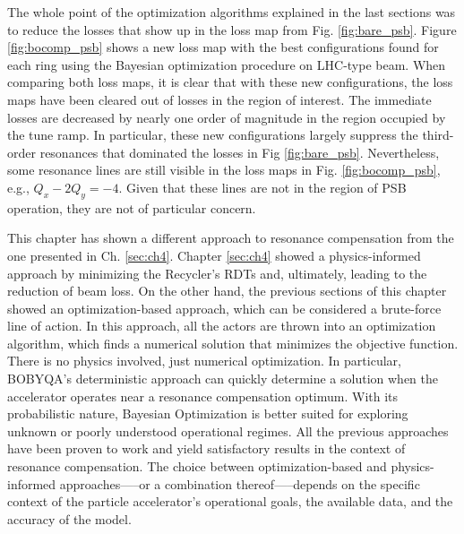 The whole point of the optimization algorithms explained in the last sections was to reduce the losses that show up in the loss map from Fig. \ref{fig:bare_psb}. Figure \ref{fig:bocomp_psb} shows a new loss map with the best configurations found for each ring using the Bayesian optimization procedure on LHC-type beam. When comparing both loss maps, it is clear that with these new configurations, the loss maps have been cleared out of losses in the region of interest. The immediate losses are decreased by nearly one order of magnitude in the region occupied by the tune ramp. In particular, these new configurations largely suppress the third-order resonances that dominated the losses in Fig \ref{fig:bare_psb}. Nevertheless, some resonance lines are still visible in the loss maps in Fig. \ref{fig:bocomp_psb}, e.g., $Q_x - 2 Q_y = -4$. Given that these lines are not in the region of PSB operation, they are not of particular concern. 

This chapter has shown a different approach to resonance compensation from the one presented in Ch. \ref{sec:ch4}. Chapter \ref{sec:ch4} showed a physics-informed approach by minimizing the Recycler's RDTs and, ultimately, leading to the reduction of beam loss. On the other hand, the previous sections of this chapter showed an optimization-based approach, which can be considered a brute-force line of action. In this approach, all the actors are thrown into an optimization algorithm, which finds a numerical solution that minimizes the objective function. There is no physics involved, just numerical optimization. In particular, BOBYQA's deterministic approach can quickly determine a solution when the accelerator operates near a resonance compensation optimum. With its probabilistic nature, Bayesian Optimization is better suited for exploring unknown or poorly understood operational regimes. All the previous approaches have been proven to work and yield satisfactory results in the context of resonance compensation. The choice between optimization-based and physics-informed approaches—--or a combination thereof—--depends on the specific context of the particle accelerator's operational goals, the available data, and the accuracy of the model.

